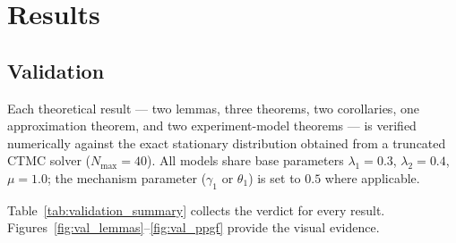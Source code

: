 \section{Results}\label{sec:results}

\subsection{Validation}


Each theoretical result — two lemmas, three theorems, two corollaries, one
approximation theorem, and two experiment-model theorems — is verified
numerically against the exact stationary distribution obtained from a truncated
CTMC solver ($N_{\max}=40$).  All models share base parameters
$\lambda_1=0.3$, $\lambda_2=0.4$, $\mu=1.0$; the mechanism parameter
($\gamma_1$ or $\theta_1$) is set to $0.5$ where applicable.

Table~\ref{tab:validation_summary} collects the verdict for every result.
Figures~\ref{fig:val_lemmas}--\ref{fig:val_ppgf} provide the visual evidence.

